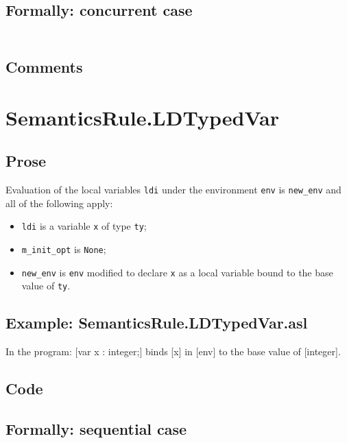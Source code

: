 \documentclass{book}
\begin{document}
  \subsection{Formally: concurrent case}
  \begin{align}
  \end{align} 

    \subsection{Comments}

\section{SemanticsRule.LDTypedVar \label{sec:SemanticsRule.LDTypedVar}}

    \subsection{Prose}
Evaluation of the local variables \texttt{ldi} under the environment
\texttt{env} is \texttt{new\_env} and all of the following apply:
    \begin{itemize}
    \item \texttt{ldi} is a variable \texttt{x} of type \texttt{ty};
    \item \texttt{m\_init\_opt} is \texttt{None};
    \item \texttt{new\_env} is \texttt{env} modified to declare \texttt{x} as a local variable bound to
      the base value of \texttt{ty}.
    \end{itemize}

    \subsection{Example: SemanticsRule.LDTypedVar.asl}
    In the program:
    [var x : integer;] binds [x] in [env] to the base value of [integer].

  \subsection{Code}

  \subsection{Formally: sequential case}
  \begin{align}
  \end{align} 
\end{document}
